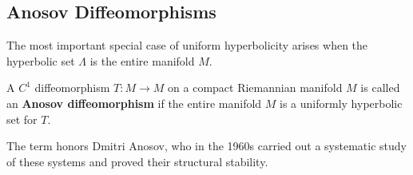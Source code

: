 \subsection{Anosov Diffeomorphisms}\label{sec:12.1.2}

The most important special case of uniform hyperbolicity arises when the hyperbolic set $\Lambda$ is the entire manifold $M$.

\begin{definition}\label{def:12.2}
A $C^1$ diffeomorphism $T: M \to M$ on a compact Riemannian manifold $M$ is called an \textbf{Anosov diffeomorphism} if the entire manifold $M$ is a uniformly hyperbolic set for $T$.

The term honors Dmitri Anosov, who in the 1960s carried out a systematic study of these systems and proved their structural stability.
\end{definition}


